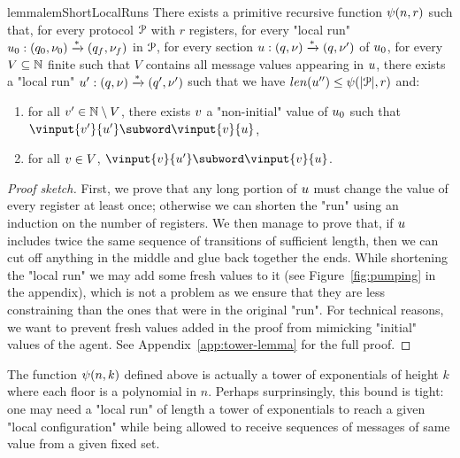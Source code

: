 \begin{restatable}{lemma}{lemShortLocalRuns}
	\label{lem:short-local-runs}
	There exists a primitive recursive function $\psi(n,r)$ such that, for every protocol $\mathcal{P}$ with $r$ registers, for every "local run" $u_0: (q_0, \nu_0) \xrightarrow{*} (q_f, \nu_f)$ in $\mathcal{P}$, for every section $u : (q, \nu) \xrightarrow{*} (q, \nu')$ of $u_0$,  for every $V \subseteq \mathbb{N}$ finite such that $V$ contains all message values appearing in $u$, there exists a "local run" $u': (q, \nu) \xrightarrow{*} (q', \nu')$ such that we have $\length{\localrun''} \leq \towerfun(\size{\prot},r)$ and:
	\begin{enumerate}
		\item for all $v' \in \mathbb{N} \setminus V$, there exists $v$ a "non-initial" value of $u_0$ such that $\vinput{\aval'}{\localrun'}\subword \vinput{\aval}{\localrun}$,
		\item for all $v \in V$, $\vinput{\aval}{\localrun'} \subword \vinput{\aval}{\localrun}$. 
	\end{enumerate}
\end{restatable}

\begin{proof}[Proof sketch]
	First, we prove that any long portion of $u$ must change the value of every register at least once; otherwise we can shorten the "run" using an induction on the number of registers. We then manage to prove that, if $u$ includes twice the same sequence of transitions of sufficient length, then we can cut off anything in the middle and glue back together the ends. While shortening the "local run" we may add some fresh values to it (see Figure~\ref{fig:pumping} in the appendix), which is not a problem as we ensure that they are less constraining than the ones that were in the original "run". For technical reasons, we want to prevent fresh values added in the proof from mimicking "initial" values of the agent.
	See Appendix~\ref{app:tower-lemma} for the full proof.
\end{proof}

\begin{remark}
	The function $\psi(n,k)$ defined above is actually a tower of exponentials of height $k$ where each floor is a polynomial in $n$. Perhaps surprinsingly, this bound is tight: one may need a "local run" of length a tower of exponentials to reach a given "local configuration" while being allowed to receive sequences of messages of same value from a given fixed set. 
\end{remark}

